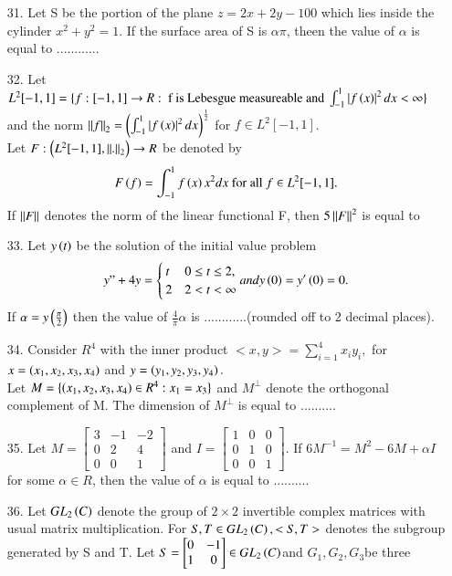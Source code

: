\documentclass[journal]{IEEEtran}
\begin{document}
\begin{enumerate}
    \item[31.] Let S be the portion of the plane $z=2x+2y-100$ which lies inside the cylinder $x^2+y^2=1$. If the surface area of S is $\alpha\pi$, theen the value of $\alpha$ is equal to ............ 
    \item[32.] Let $L^2[-1,1] = \{f:[-1,1]\to R:\text{ f is Lebesgue measureable and }\int_{-1}^{1}\left\vert f\left(x\right)\right\vert^2dx<\infty\}$ and the norm $\left\lVert f\right\rVert_2=\left(\int_{-1}^{1}\left\vert f\left(x\right)\right\vert^2dx\right)^{\frac{1}{2}}$ for $f\in L^2[-1,1]$.\\
    Let $F:\left(L^2[-1,1],\left\lVert.\right\rVert_2\right)\to R$ be denoted by $$F\left(f\right) = \int_{-1}^{1}f\left(x\right)x^2dx\text{  for all }f\in L^2[-1,1].$$ If $\left\lVert F\right\rVert$ denotes the norm of the linear functional F, then $5\left\lVert F\right\rVert^2$ is equal to 
    \item[33.] Let $y\left(t\right)$ be the solution of the initial value problem $$y"+4y = \begin{cases}t&0\leq t\leq 2,\\2&2<t<\infty \end{cases} and y\left(0\right) = y'\left(0\right) = 0.$$ If $\alpha = y\left(\frac{\pi}{2}\right)$ then the value of $\frac{4}{\pi}\alpha$ is ............(rounded off to 2 decimal places).
    \item[34.] Consider $R^4$ with the inner product $<x,y> = \sum_{i=1}^{4}x_iy_i,$ for $x = \left(x_1, x_2, x_3, x_4\right)$ and $y = \left(y_1, y_2, y_3, y_4\right).$\\Let $M = \{\left(x_1, x_2, x_3, x_4\right)\in R^4 : x_1=x_3\}$ and $M^\bot$ denote the orthogonal complement of M. The dimension of $M^{\bot}$ is equal to .......... 
    \item[35.] Let $M = \begin{bmatrix}3&-1&-2\\0&2&4\\0&0&1\end{bmatrix}$ and $I = \begin{bmatrix}1&0&0\\0&1&0\\0&0&1\end{bmatrix}$. If $6M^{-1} = M^2 - 6M + \alpha I$ for some $\alpha \in R$, then the value of $\alpha$ is equal to .......... 
    \item[36.] Let $GL_2\left(C\right)$ denote the group of $2 \times 2$ invertible complex matrices with usual
    matrix multiplication. For $S, T \in GL_2\left(C\right), < S, T >$ denotes the subgroup generated by S and T. Let $S = \begin{bmatrix}0&-1\\1&0\end{bmatrix} \in GL_2\left(C\right)$and $G_1, G_2, G_3$be three

\end{enumerate}
\end{document}
